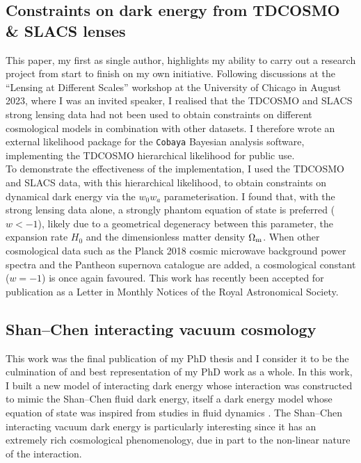 \documentclass[11pt]{article}
\begin{document}
    \subsection{Constraints on dark energy from TDCOSMO \& SLACS lenses}
    This paper, my first as single author, highlights my ability to carry out a research project from start to finish on my own initiative. Following discussions at the ``Lensing at Different Scales'' workshop at the University of Chicago in August 2023, where I was an invited speaker, I realised that the TDCOSMO and SLACS strong lensing data had not been used to obtain constraints on different cosmological models in combination with other datasets. I therefore wrote an external likelihood package for the \texttt{Cobaya} Bayesian analysis software, implementing the TDCOSMO hierarchical likelihood \cite{Birrer:2020tax} for public use. \\
    
    To demonstrate the effectiveness of the implementation, I used the TDCOSMO and SLACS data, with this hierarchical likelihood, to obtain constraints on dynamical dark energy via the $w_0w_a$ parameterisation. I found that, with the strong lensing data alone, a strongly phantom equation of state is preferred ($w<-1$), likely due to a geometrical degeneracy between this parameter, the expansion rate $H_0$ and the dimensionless matter density $\Omega_{\rm m}$. When other cosmological data such as the Planck 2018 cosmic microwave background power spectra and the Pantheon supernova catalogue are added, a cosmological constant ($w=-1$) is once again favoured. This work has recently been accepted for publication as a Letter in Monthly Notices of the Royal Astronomical Society.
    
    \subsection{Shan--Chen interacting vacuum cosmology}
    This work was the final publication of my PhD thesis and I consider it to be the culmination of and best representation of my PhD work as a whole. In this work, I built a new model of interacting dark energy whose interaction was constructed to mimic the Shan--Chen fluid dark energy, itself a dark energy model whose equation of state was inspired from studies in fluid dynamics  \cite{Shan1993, Bini:2014pmk, Bini:2016wqr}. The Shan--Chen interacting vacuum dark energy is particularly interesting since it has an extremely rich cosmological phenomenology, due in part to the non-linear nature of the interaction. \\
    
\end{document}
